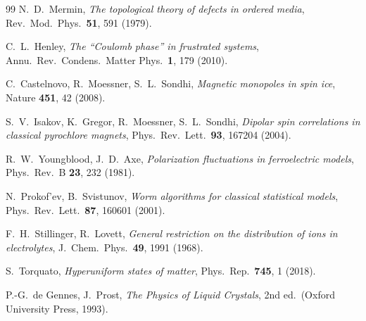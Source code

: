 \documentclass[11pt]{article}
\begin{document}
\begin{thebibliography}{99}
 N.~D.~Mermin,
\emph{The topological theory of defects in ordered media},
Rev.\ Mod.\ Phys.\ \textbf{51}, 591 (1979).

 C.~L.~Henley,
\emph{The ``Coulomb phase'' in frustrated systems},
Annu.\ Rev.\ Condens.\ Matter Phys.\ \textbf{1}, 179 (2010).

 C.~Castelnovo, R.~Moessner, S.~L.~Sondhi,
\emph{Magnetic monopoles in spin ice},
Nature \textbf{451}, 42 (2008).

 S.~V.~Isakov, K.~Gregor, R.~Moessner, S.~L.~Sondhi,
\emph{Dipolar spin correlations in classical pyrochlore magnets},
Phys.\ Rev.\ Lett.\ \textbf{93}, 167204 (2004).

 R.~W.~Youngblood, J.~D.~Axe,
\emph{Polarization fluctuations in ferroelectric models},
Phys.\ Rev.\ B \textbf{23}, 232 (1981).

 N.~Prokof'ev, B.~Svistunov,
\emph{Worm algorithms for classical statistical models},
Phys.\ Rev.\ Lett.\ \textbf{87}, 160601 (2001).

 F.~H.~Stillinger, R.~Lovett,
\emph{General restriction on the distribution of ions in electrolytes},
J.\ Chem.\ Phys.\ \textbf{49}, 1991 (1968).

 S.~Torquato,
\emph{Hyperuniform states of matter},
Phys.\ Rep.\ \textbf{745}, 1 (2018).

 P.-G.~de Gennes, J.~Prost,
\emph{The Physics of Liquid Crystals}, 2nd ed.\ (Oxford University Press,
1993).

\end{thebibliography}
\end{document}
